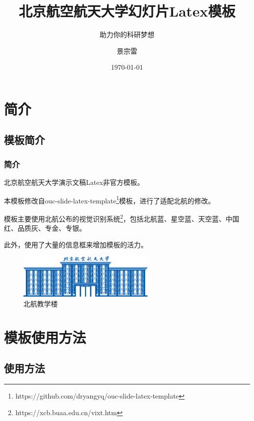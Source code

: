 \documentclass[aspectratio=169,UTF8,t]{beamer}%
\title{北京航空航天大学幻灯片Latex模板}
\subtitle{助力你的科研梦想}
\author{景宗雷}
\date{\today}
\institute{计算机学院}
\begin{document}
\maketitle

\makeoutline

\section{简介}

\subsection{模板简介}

\begin{frame}
    \frametitle{简介}
    北京航空航天大学演示文稿Latex非官方模板。

    本模板修改自ouc-slide-latex-template\footnote{https://github.com/dryangyq/ouc-slide-latex-template}模板，进行了适配北航的修改。

    模板主要使用北航公布的视觉识别系统\footnote{https://xcb.buaa.edu.cn/vixt.htm}，包括北航蓝、星空蓝、天空蓝、中国红、品质灰、专金、专银。

    此外，使用了大量的信息框来增加模板的活力。
    \begin{center}
        \begin{figure}
        \centering
        \includegraphics[width=0.6\textwidth]{figs/buaa_main.png}
            \caption{北航教学楼}
            \label{fig:ouc}
        \end{figure}
    \end{center}
    
    
\end{frame}

\section{模板使用方法}

\subsection{使用方法}
\end{document}
